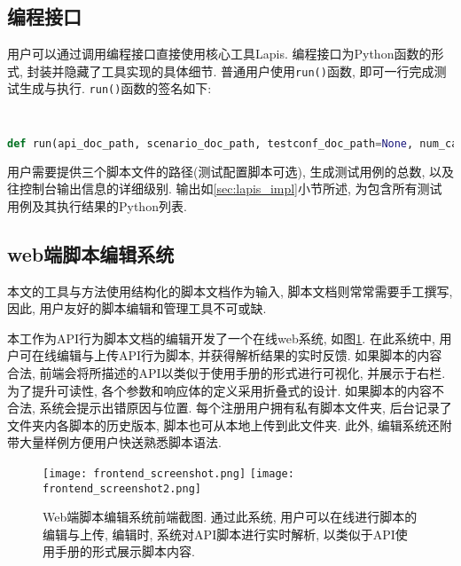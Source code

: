 		\subsection{编程接口}
            \label{sec:program_interface}
            用户可以通过调用编程接口直接使用核心工具Lapis. 编程接口为Python函数的形式, 封装并隐藏了工具实现的具体细节. 普通用户使用\texttt{run()}函数, 即可一行完成测试生成与执行. \texttt{run()}函数的签名如下:
            \begin{flushleft}
                \scriptsize
                \tt
                \begin{lstlisting}[language=python]
def run(api_doc_path, scenario_doc_path, testconf_doc_path=None, num_case=1, verbose=0)
                \end{lstlisting}
            \end{flushleft}
            用户需要提供三个脚本文件的路径(测试配置脚本可选), 生成测试用例的总数, 以及往控制台输出信息的详细级别. 输出如\ref{sec:lapis_impl}小节所述, 为包含所有测试用例及其执行结果的Python列表.
            
		\subsection{web端脚本编辑系统}

            本文的工具与方法使用结构化的脚本文档作为输入, 脚本文档则常常需要手工撰写, 因此, 用户友好的脚本编辑和管理工具不可或缺.
            
            本工作为API行为脚本文档的编辑开发了一个在线web系统, 如图\ref{fig:frontend_screenshot}. 在此系统中, 用户可在线编辑与上传API行为脚本, 并获得解析结果的实时反馈. 如果脚本的内容合法, 前端会将所描述的API以类似于使用手册的形式进行可视化, 并展示于右栏. 为了提升可读性, 各个参数和响应体的定义采用折叠式的设计. 如果脚本的内容不合法, 系统会提示出错原因与位置. 每个注册用户拥有私有脚本文件夹, 后台记录了文件夹内各脚本的历史版本, 脚本也可从本地上传到此文件夹. 此外, 编辑系统还附带大量样例方便用户快送熟悉脚本语法.

            \begin{figure}[!htb]
                \centering
                \texttt{[image: frontend\_screenshot.png]}
                \texttt{[image: frontend\_screenshot2.png]}
                \caption{Web端脚本编辑系统前端截图. 通过此系统, 用户可以在线进行脚本的编辑与上传, 编辑时, 系统对API脚本进行实时解析, 以类似于API使用手册的形式展示脚本内容.}
                \label{fig:frontend_screenshot}
            \end{figure}
            
